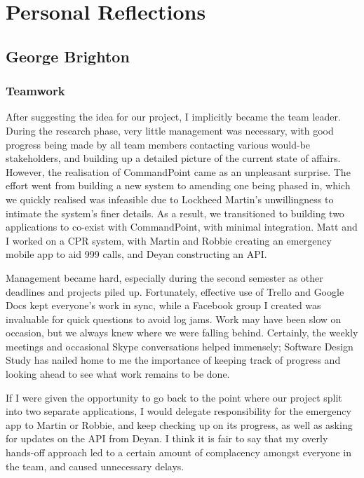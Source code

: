 \documentclass[]{article}
\begin{document}
\pagebreak
    \section{Personal Reflections}
    \subsection{George Brighton}

    \subsubsection*{Teamwork}

    After suggesting the idea for our project, I implicitly became the team leader. During the research phase, very little management was necessary, with good progress being made by all team members contacting various would-be stakeholders, and building up a detailed picture of the current state of affairs. However, the realisation of CommandPoint came as an unpleasant surprise. The effort went from building a new system to amending one being phased in, which we quickly realised was infeasible due to Lockheed Martin's unwillingness to intimate the system's finer details. As a result, we transitioned to building two applications to co-exist with CommandPoint, with minimal integration. Matt and I worked on a CPR system, with Martin and Robbie creating an emergency mobile app to aid 999 calls, and Deyan constructing an API.

    Management became hard, especially during the second semester as other deadlines and projects piled up. Fortunately, effective use of Trello and Google Docs kept everyone's work in sync, while a Facebook group I created was invaluable for quick questions to avoid log jams. Work may have been slow on occasion, but we always knew where we were falling behind. Certainly, the weekly meetings and occasional Skype conversations helped immensely; Software Design Study has nailed home to me the importance of keeping track of progress and looking ahead to see what work remains to be done.

    If I were given the opportunity to go back to the point where our project split into two separate applications, I would delegate responsibility for the emergency app to Martin or Robbie, and keep checking up on its progress, as well as asking for updates on the API from Deyan. I think it is fair to say that my overly hands-off approach led to a certain amount of complacency amongst everyone in the team, and caused unnecessary delays.
\end{document}

